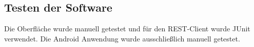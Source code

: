 \subsection{Testen der Software}

Die Oberfläche wurde manuell getestet und für den \ac{REST}-Client wurde JUnit verwendet.
Die Android Anwendung wurde ausschließlich manuell getestet.